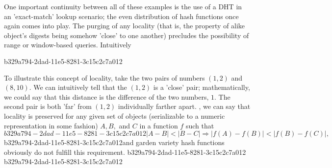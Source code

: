 \documentclass[12pt]{article}
\begin{document}
\par One important continuity between all of these examples is the use of a DHT in an 'exact-match' lookup scenario; the even distribution of hash functions once again comes into play. The purging of any locality (that is, the property of alike object's digests being somehow 'close' to one another) precludes the possibility of range or window-based queries. Intuitively

b329a794-2dad-11e5-8281-3c15c2c7a012\par To illustrate this concept of locality, take the two pairs of numbers $(1,2)$ and $(8,10)$. We can intuitively tell that the $(1,2)$ is a 'close' pair; mathematically, we could say that this distance is the difference of the two numbers, $1$. The second pair is both 'far' from $(1,2)$ individually farther apart. , we can say that locality is preserved for any given set of objects (serializable to a numeric representation in some fashion) $A,B,$ and $C$ in a function $f$ such that
\begin{equation}
b329a794-2dad-11e5-8281-3c15c2c7a012|A-B| < |B-C| \Rightarrow |f(A)-f(B)| < |f(B) - f(C)|,
\end{equation}
b329a794-2dad-11e5-8281-3c15c2c7a012and garden variety hash functions obviously do not fulfill this requirement.
b329a794-2dad-11e5-8281-3c15c2c7a012
\printbibliography
b329a794-2dad-11e5-8281-3c15c2c7a012
\end{document}
